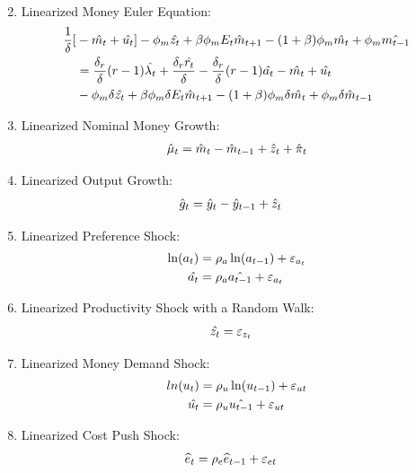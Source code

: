 \documentclass[11pt,preprint, authoryear]{elsarticle}
\numberwithin{equation}{section}
\numberwithin{figure}{section}
\numberwithin{table}{section}
\begin{document}
\begin{enumerate}
\begin{align}
  \end{align}
\item
  Linearized Money Euler Equation: \begin{align} \notag
  {\frac{1}{\delta}}[&-{\hat{m_t}}+{\hat{u_t}}]-{\phi_m}{\hat{z_t}}+{\beta}{\phi_m}{E_t}{\hat{m}_{t+1}}-(1+\beta){\phi_m}{\hat{m_t}}+{\phi_m}{\hat{m_{t-1}}} \notag \\
  &={\frac{\delta_r}{\delta}}(r-1){\hat{\lambda_t}}+{\frac{\delta_r\hat{r_t}}{\delta}}-\frac{\delta_r}{\delta}(r-1){\hat{a_t}}-{\hat{m_t}}+{\hat{u_t}}\notag\\
  &-{\phi_m}{\delta}{\hat{z_t}}+{\beta}{\phi_m}{\delta}{E_t}{\hat{m}_{t+1}}-({1+\beta}){\phi_m}{\delta}{\hat{m_t}}+{\phi_m}{\delta}{\hat{m}_{t-1}} \notag
  \end{align}
\item
  Linearized Nominal Money Growth: \begin{align} \notag
  \hat{\mu}_{t}=\hat{m}_{t}-\hat{m}_{t-1}+\hat{z}_{t}+\hat\pi_{t} 
  \end{align}
\item
  Linearized Output Growth: \begin{align} \notag
  \hat{g}_{t}&=\hat{y}_{t}-\hat{y}_{t-1}+\hat{z}_{t} 
  \end{align}
\item
  Linearized Preference Shock: \begin{align} \notag
  \ln (a_t) &= \rho_a \ln (a_{t-1}) + \varepsilon_{a_{t}} \notag \\
  \hat{a_{t}} &= \rho_{a} \hat{a_{t-1}}+ \varepsilon_{a_{t}} \notag
  \end{align}
\item
  Linearized Productivity Shock with a Random Walk: \begin{align} \notag
  \hat{z_t} &= \varepsilon_{z_{t}}
  \end{align}
\item
  Linearized Money Demand Shock: \begin{align*} \notag
  ln (u_t)&= \rho_u \ln (u_{t-1})+ \varepsilon_{ut} \notag \\
  \hat{u_t}&= \rho_u \hat{u_{t-1}}+\varepsilon_{ut}
  \end{align*}
\item
  Linearized Cost Push Shock: \begin{align*} \notag
  \widehat{e}_{t}&= \rho_{e}\widehat{e}_{t-1} + \varepsilon_{et}
  \end{align*}
\end{enumerate}
\end{document}
